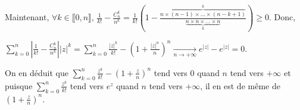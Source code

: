 {{Maintenant, $\forall k\in\llbracket0,n\rrbracket$, $ \frac{1}{k!}- \frac{C_n^k}{n^k}= \frac{1}{k!}\left(1-  \frac{\overbrace{n\times(n-1)\times\ldots\times(n-k+1)}^{k}}{\underbrace{n\times n\times\ldots\times n}_{k}}\right)\geqslant 0$. Donc,

\begin{center}
$\sum_{k=0}^{n}\left| \frac{1}{k!}- \frac{C_n^k}{n^k}\right||z|^k=\sum_{k=0}^{n} \frac{|z|^k}{k!}-\left(1+ \frac{|z|^n}{n}\right)^n\underset{n\rightarrow+\infty}{\rightarrow}e^{|z|}-e^{|z|}= 0$.
\end{center}

On en déduit que $\sum_{k=0}^{n} \frac{z^k}{k!}-\left(1+ \frac{z}{n}\right)^n$ tend vers $0$ quand $n$ tend vers $+\infty$ et puisque $\sum_{k=0}^{n} \frac{z^k}{k!}$ tend vers $e^z$ quand $n$ tend vers $+\infty$, il en est de même de $\left(1+ \frac{z}{n}\right)^n$.}
}